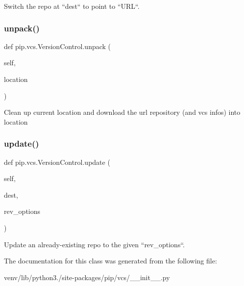 \begin{DoxyVerb}Switch the repo at ``dest`` to point to ``URL``.
\end{DoxyVerb}
 \mbox{\label{classpip_1_1vcs_1_1_version_control_ab6172a920a48d0638cf2f221b54f1124}} 
\subsubsection{\texorpdfstring{unpack()}{unpack()}}
{\footnotesize\ttfamily def pip.\+vcs.\+Version\+Control.\+unpack (\begin{DoxyParamCaption}\item[{}]{self,  }\item[{}]{location }\end{DoxyParamCaption})}

\begin{DoxyVerb}Clean up current location and download the url repository
(and vcs infos) into location
\end{DoxyVerb}
 \mbox{\label{classpip_1_1vcs_1_1_version_control_a21a7db52b55e48e35d17c1981fcd707f}} 
\subsubsection{\texorpdfstring{update()}{update()}}
{\footnotesize\ttfamily def pip.\+vcs.\+Version\+Control.\+update (\begin{DoxyParamCaption}\item[{}]{self,  }\item[{}]{dest,  }\item[{}]{rev\+\_\+options }\end{DoxyParamCaption})}

\begin{DoxyVerb}Update an already-existing repo to the given ``rev_options``.
\end{DoxyVerb}
 

The documentation for this class was generated from the following file\+:\begin{DoxyCompactItemize}
\item 
venv/lib/python3./site-\/packages/pip/vcs/\+\_\+\+\_\+init\+\_\+\+\_\+.\+py\end{DoxyCompactItemize}

